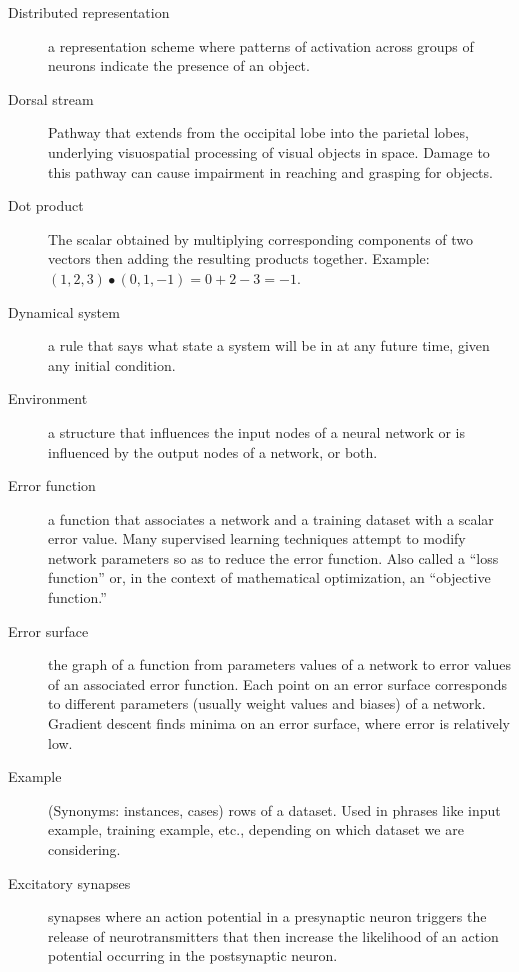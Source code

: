 \begin{description}
\item[Distributed representation] a representation scheme where patterns of activation across groups of neurons indicate the presence of an object. 

\item[Dorsal stream] Pathway that extends from the occipital lobe into the parietal lobes, underlying visuospatial processing of visual objects in space. Damage to this pathway can cause impairment in reaching and grasping for objects. 

\item[Dot product] The scalar obtained by multiplying corresponding components of two vectors then adding the resulting products together. Example: $(1,2,3) \bullet (0,1,-1) = 0+2-3 = -1$.

\item[Dynamical system] a rule that says what state a system will be in at any future time, given any initial condition.

\item[Environment] a structure that influences the input nodes of a neural network or is influenced by the output nodes of a network, or both.

\item[Error function] a function that associates a network and a training dataset with a scalar error value. Many supervised learning techniques attempt to modify network parameters so as to reduce the error function. Also called a ``loss function'' or, in the context of mathematical optimization, an ``objective function.''

\item[Error surface] the graph of a function from parameters values of a network to error values of an associated error function. Each point on an error surface corresponds to different parameters (usually weight values and biases) of a network. Gradient descent finds minima on an error surface, where error is relatively low.

\item[Example] (Synonyms: instances, cases) rows of a dataset. Used in phrases like input example, training example, etc., depending on which dataset we are considering.

\item[Excitatory synapses] synapses where an action potential in a presynaptic neuron triggers the release of neurotransmitters that then increase the likelihood of an action potential occurring in the postsynaptic neuron.


\end{description}
